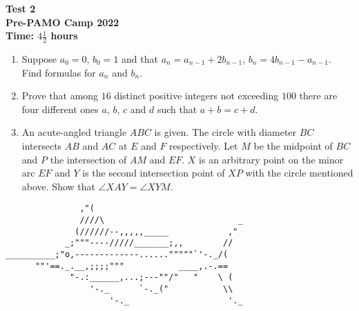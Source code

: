 \documentclass{article}
\begin{document}
	\thispagestyle{empty}
	
	\begin{center}
		\textbf{\Large Test 2}
		\\ \vspace{1em}
		\textbf{\large Pre-PAMO Camp 2022}
		\\ \vspace{1em}
		\textbf{\large Time: $4\frac{1}{2}$ hours}
	\end{center}
	
	\vspace{24pt}
	
	\begin{enumerate}[itemsep=12pt]
		
		\item 
		Suppose $a_0 = 0$, $b_0 = 1$ and that $a_n = a_{n-1} + 2b_{n-1}$, $b_n =    4b_{n-1} -a_{n-1}$. Find formulas for $a_n$ and $b_n$.
	
		\item %
		Prove that among $16$ distinct positive integers not exceeding $100$ there are four different ones $a$, $b$, $c$ and $d$ such that $a+b = c+d$.
		
		\item %
		An acute-angled triangle $ABC$ is given. The circle with diameter $BC$ intersects $AB$ and $AC$ at $E$ and $F$ respectively. Let $M$ be the midpoint of $BC$ and $P$ the intersection of $AM$ and $EF$. $X$ is an arbitrary point on the minor arc $EF$ and $Y$ is the second intersection point of $XP$ with the circle mentioned above. Show that $\angle XAY = \angle XYM$.
		
	\end{enumerate}
	
\vfill
\centering
\begin{BVerbatim}
               ,"(
               ////\                           _
              (//////--,,,,,_____            ,"
            _;"""----/////_______;,,        //
__________;"o,-------------......"""""`'-._/(
      ""'==._.__,;;;;"""           ____,.-.==
             "-.:______,...;---""/"   "    \ (
                 '-._      `-._("           \\
                     '-._                    '._	
\end{BVerbatim}	
	
\end{document}
